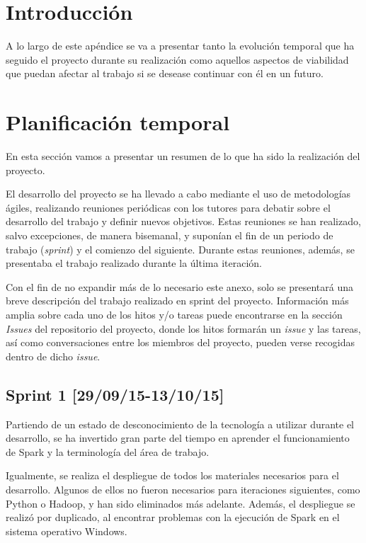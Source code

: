 
\section{Introducción}

A lo largo de este apéndice se va a presentar tanto la evolución temporal que ha seguido el proyecto durante su realización como aquellos aspectos de viabilidad que puedan afectar al trabajo si se desease continuar con él en un futuro.

\section{Planificación temporal}

En esta sección vamos a presentar un resumen de lo que ha sido la realización del proyecto. 

El desarrollo del proyecto se ha llevado a cabo mediante el uso de metodologías ágiles, realizando reuniones periódicas con los tutores para debatir sobre el desarrollo del trabajo y definir nuevos objetivos. Estas reuniones se han realizado, salvo excepciones, de manera bisemanal, y suponían el fin de un periodo de trabajo (\textit{sprint}) y el comienzo del siguiente. Durante estas reuniones, además, se presentaba el trabajo realizado durante la última iteración.

Con el fin de no expandir más de lo necesario este anexo, solo se presentará una breve descripción del trabajo realizado en sprint del proyecto. Información más amplia sobre cada uno de los hitos y/o tareas puede encontrarse en la sección \textit{Issues} del repositorio del proyecto, donde los hitos formarán un \textit{issue} y las tareas, así como conversaciones entre los miembros del proyecto, pueden verse recogidas dentro de dicho \textit{issue}.

\subsection{Sprint 1 [29/09/15-13/10/15]}

Partiendo de un estado de desconocimiento de la tecnología a utilizar durante el desarrollo, se ha invertido gran parte del tiempo en aprender el funcionamiento de Spark y la terminología del área de trabajo.

Igualmente, se realiza el despliegue de todos los materiales necesarios para el desarrollo. Algunos de ellos no fueron necesarios para iteraciones siguientes, como Python o Hadoop, y han sido eliminados más adelante. Además, el despliegue se realizó por duplicado, al encontrar problemas con la ejecución de Spark en el sistema operativo Windows.

